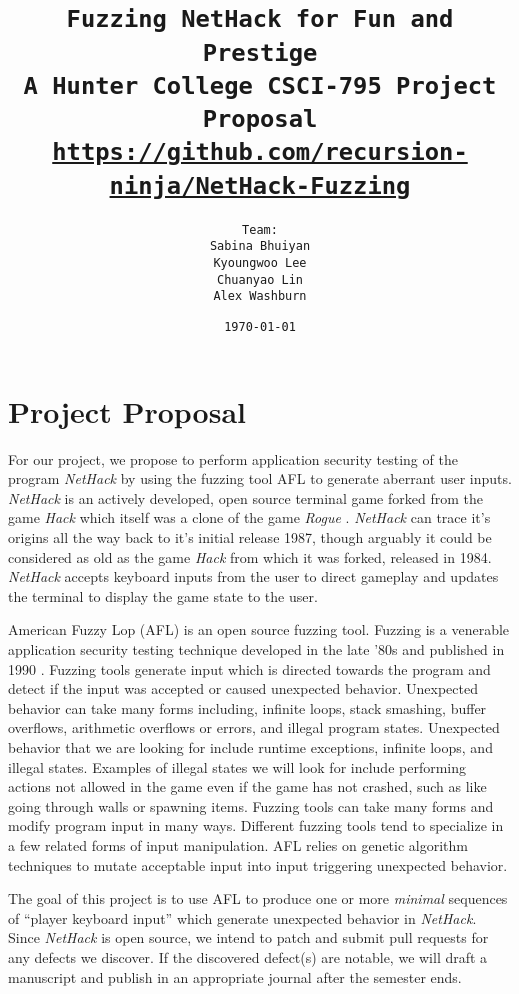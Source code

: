 \documentclass[12pt]{diazessay}
\title{\texttt{\huge{Fuzzing NetHack for Fun and Prestige} \\\vspace{-0.65cm} {\large A Hunter College CSCI-795 Project Proposal}\\\normalsize\url{https://github.com/recursion-ninja/NetHack-Fuzzing}}} %
\author{\texttt{{\Huge Team:}\\\vspace*{-0.5em} 
		Sabina Bhuiyan \\\vspace*{-0.5em} 
		Kyoungwoo Lee \\\vspace*{-0.5em}
		Chuanyao Lin \\\vspace*{-0.25em}
		Alex Washburn}} %
\date{\texttt{\today}} %
\begin{document}
\maketitle %

\vspace{-1cm}
\section*{Project Proposal}

For our project, we propose to perform application security testing of the program \emph{NetHack} \cite{NetHack_page} \cite{NetHack01} by using the fuzzing tool AFL \cite{AFL_page} to generate aberrant user inputs. 
\emph{NetHack} is an actively developed, open source terminal game forked from the game \emph{Hack} \cite{Hack} which itself was a clone of the game \emph{Rogue} \cite{Rogue} \cite{Rogue01}. 
\emph{NetHack} can trace it's origins all the way back to it's initial release 1987, though arguably it could be considered as old as the game \emph{Hack} from which it was forked, released in 1984. 
\emph{NetHack} accepts keyboard inputs from the user to direct gameplay and updates the terminal to display the game state to the user.

American Fuzzy Lop (AFL) \cite{AFL_page} is an open source fuzzing tool.
Fuzzing is a venerable application security testing technique developed in the late '80s \cite{Barton1988} and published in 1990 \cite{Miller1990}.
Fuzzing tools generate input which is directed towards the program and detect if the input was accepted or caused unexpected behavior.
Unexpected behavior can take many forms including, infinite loops, stack smashing, buffer overflows, arithmetic overflows or errors, and illegal program states.
Unexpected behavior that we are looking for include runtime exceptions, infinite loops, and illegal states.
Examples of illegal states we will look for include performing actions not allowed in the game even if the game has not crashed, such as like going through walls or spawning items.
Fuzzing tools can take many forms \cite{ModelBasedFuzzing}\cite{GrammarBasedFuzzing}\cite{ProtocolBasedFuzzing} and modify program input in many ways.
Different fuzzing tools tend to specialize in a few related forms of input\cite{InputDiversity} manipulation.
AFL relies on genetic algorithm techniques\cite{InputMutationAlgorithm} to mutate acceptable input into input triggering unexpected behavior.

The goal of this project is to use AFL to produce one or more \emph{minimal} sequences of ``player keyboard input''\cite{PlayerKeyboardInput} which generate unexpected behavior in \emph{NetHack}.
Since \emph{NetHack} is open source, we intend to patch and submit pull requests for any defects we discover.
If the discovered defect(s) are notable, we will draft a manuscript and publish in an appropriate journal after the semester ends.
\end{document}
